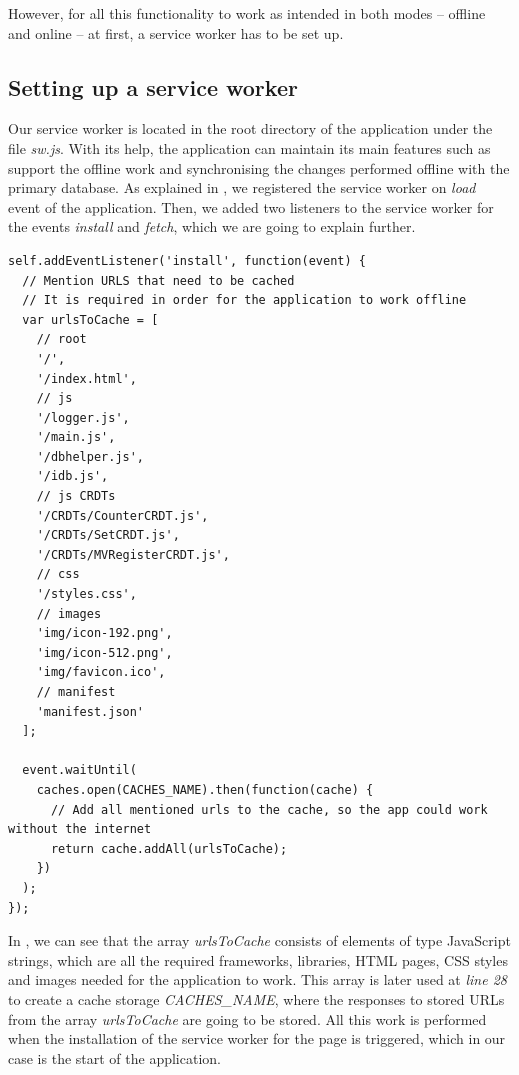 However, for all this functionality to work as intended in both modes -- offline and online -- at first, a service worker has to be set up. 

\subsection*{Setting up a service worker}

Our service worker is located in the root directory of the application under the file \textit{sw.js}. With its help, the application can maintain its main features such as support the offline work and synchronising the changes performed offline with the primary database. As explained in , we registered the service worker on \textit{load} event of the application. Then, we added two listeners to the service worker for the events \textit{install} and \textit{fetch}, which we are going to explain further.

\begin{lstlisting}[caption={Code for caching necessary data for the client.}, label={lst:dev4}]
self.addEventListener('install', function(event) {
  // Mention URLS that need to be cached
  // It is required in order for the application to work offline
  var urlsToCache = [
    // root
    '/',
    '/index.html',
    // js
    '/logger.js',
    '/main.js',
    '/dbhelper.js',
    '/idb.js',
    // js CRDTs
    '/CRDTs/CounterCRDT.js',
    '/CRDTs/SetCRDT.js',
    '/CRDTs/MVRegisterCRDT.js',
    // css
    '/styles.css',
    // images
    'img/icon-192.png',
    'img/icon-512.png',
    'img/favicon.ico',
    // manifest
    'manifest.json'
  ];

  event.waitUntil(
    caches.open(CACHES_NAME).then(function(cache) {
      // Add all mentioned urls to the cache, so the app could work without the internet
      return cache.addAll(urlsToCache);
    })
  );
});
\end{lstlisting}

In , we can see that the array \textit{urlsToCache} consists of elements of type JavaScript strings, which are all the required frameworks, libraries, HTML pages, CSS styles and images needed for the application to work. This array is later used at \textit{line 28} to create a cache storage \textit{CACHES\_NAME}, where the responses to stored URLs from the array \textit{urlsToCache} are going to be stored. All this work is performed when the installation of the service worker for the page is triggered, which in our case is the start of the application. 

